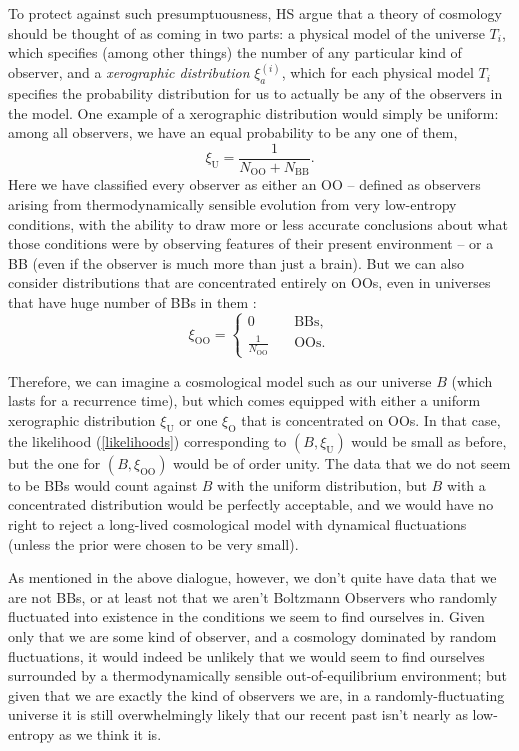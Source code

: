 \documentclass[12pt,letterpaper]{article}
\newcommand{\be}{\begin{equation}}
\newcommand{\ee}{\end{equation}}
\newcommand{\OO}{{\mathrm{OO}}}
\newcommand{\BB}{{\mathrm{BB}}}
\begin{document}
To protect against such presumptuousness, HS argue that a theory of cosmology should be thought of as coming in two parts: a physical model of the universe $T_i$, which specifies (among other things) the number of any particular kind of observer, and a \emph{xerographic distribution} $\xi^{(i)}_a$, which for each physical model $T_i$ specifies the probability distribution for us to actually be any of the observers in the model. 
One example of a xerographic distribution would simply be uniform: among all observers, we have an equal probability to be any one of them,
\be
  \xi_\mathrm{U} = \frac{1}{N_\OO + N_\BB}.
\ee
Here we have classified every observer as either an OO -- defined as observers arising from thermodynamically sensible evolution from very low-entropy conditions, with the ability to draw more or less accurate conclusions about what those conditions were by observing features of their present environment -- or a BB (even if the observer is much more than just a brain).
But we can also consider distributions that are concentrated entirely on OOs, even in universes that have huge number of BBs in them :
\be
  \xi_\mathrm{OO} = 
    \begin{cases}
  0& \quad \mathrm{BBs}, \\ 
  \frac{1}{N_\OO} &\quad \mathrm{OOs}.
  \end{cases}
  \label{xerographic}
\ee

Therefore, we can imagine a cosmological model such as our universe $B$ (which lasts for a recurrence time), but which comes equipped with either a uniform xerographic distribution $\xi_\mathrm{U}$ or one $\xi_\mathrm{O}$ that is concentrated on OOs.
In that case, the likelihood (\ref{likelihoods}) corresponding to $(B, \xi_\mathrm{U})$ would be small as before, but the one for $(B, \xi_\mathrm{OO})$ would be of order unity.
The data that we do not seem to be BBs would count against $B$ with the uniform distribution, but $B$ with a concentrated distribution would be perfectly acceptable, and we would have no right to reject a long-lived cosmological model with dynamical fluctuations (unless the prior were chosen to be very small).

As mentioned in the above dialogue, however, we don't quite have data that we are not BBs, or at least not that we aren't Boltzmann Observers who randomly fluctuated into existence in the conditions we seem to find ourselves in.
Given only that we are some kind of observer, and a cosmology dominated by random fluctuations, it would indeed be unlikely that we would seem to find ourselves surrounded by a thermodynamically sensible out-of-equilibrium environment; but given  that we are exactly the kind of observers we are, in a randomly-fluctuating universe it is still overwhelmingly likely that our recent past isn't nearly as low-entropy as we think it is.
\end{document}
